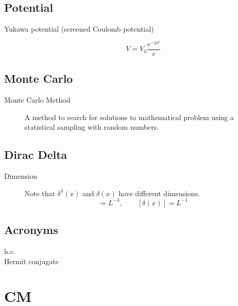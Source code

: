 \subsection{Potential}
\begin{description}
    \item [Yukawa potential (screened Coulomb potential)]
	\begin{equation}
	    \label{eqn:Yukawa}
	    V = V_0\frac{e^{-\mu r}}{r}
	\end{equation}
\end{description}

\subsection{Monte Carlo}
\begin{description}
    \item [Monte Carlo Method]
	A method to search for solutions to mathematical problem using a statistical sampling with random numbers.
\end{description}

\subsection{Dirac Delta}
\begin{description}
    \item [Dimension] 
	Note that $\delta^3(x)$ and $\delta(x)$ have different dimensions.
	\begin{equation}
	    [\delta^3(x)] = L^{-3}, \qquad [\delta(x)] = L^{-1}
	\end{equation}
\end{description}

\subsection{Acronyms}
h.c.	\\
    Hermit conjugate	\\


\section{CM}


